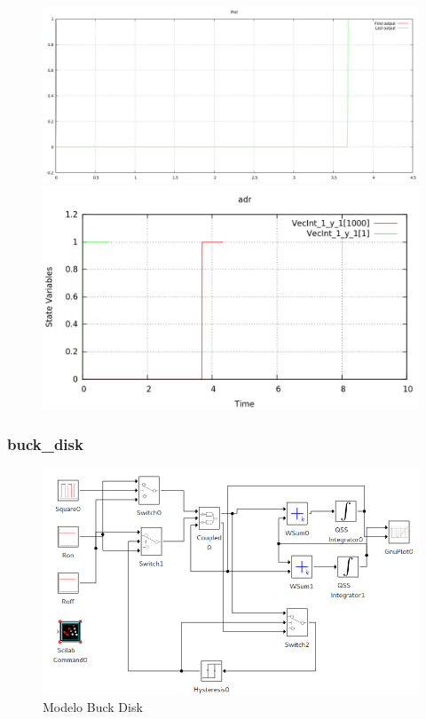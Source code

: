 \documentclass[a4paper,	11pt]{report}
\begin{document}
\begin{figure}[H]
\centering
\begin{minipage}{0.5\textwidth}
\centering
 \includegraphics[width=\linewidth]{adr-pd}
\end{minipage}\hfill
\begin{minipage}{0.5\textwidth}
\centering
 \includegraphics[width=\linewidth]{adr-qss}
\end{minipage}
\end{figure}

\subsubsection{buck\_disk}

\begin{figure}[H]
\includegraphics[width=0.75\linewidth]{buck_disk}
\caption{Modelo Buck Disk}
\end{figure}
\end{document}
